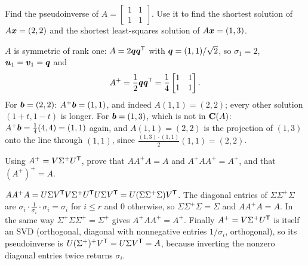 \begin{exercise}\label{exr:u36-ones}
Find the pseudoinverse of $A=\begin{bmatrix}1&1\\1&1\end{bmatrix}$. Use it to find the shortest solution of $A\boldsymbol{x}=(2,2)$ and the shortest least-squares solution of $A\boldsymbol{x}=(1,3)$.
\end{exercise}
\begin{solution}
$A$ is symmetric of rank one: $A=2\boldsymbol{q}\boldsymbol{q}^{\mathsf{T}}$ with $\boldsymbol{q}=(1,1)/\sqrt2$, so $\sigma_1=2$, $\boldsymbol{u}_1=\boldsymbol{v}_1=\boldsymbol{q}$ and
\[
A^{+}=\frac{1}{2}\boldsymbol{q}\boldsymbol{q}^{\mathsf{T}}=\frac14\begin{bmatrix}1&1\\1&1\end{bmatrix}.
\]
For $\boldsymbol{b}=(2,2)$: $A^{+}\boldsymbol{b}=(1,1)$, and indeed $A(1,1)=(2,2)$; every other solution $(1+t,1-t)$ is longer. For $\boldsymbol{b}=(1,3)$, which is not in $\mathbf{C}(A)$: $A^{+}\boldsymbol{b}=\tfrac14(4,4)=(1,1)$ again, and $A(1,1)=(2,2)$ is the projection of $(1,3)$ onto the line through $(1,1)$, since $\frac{(1,3)\cdot(1,1)}{2}(1,1)=(2,2)$.
\end{solution}

\begin{exercise}\label{exr:u36-penrose}
Using $A^{+}=V\Sigma^{+}U^{\mathsf{T}}$, prove that $AA^{+}A=A$ and $A^{+}AA^{+}=A^{+}$, and that $(A^{+})^{+}=A$.
\end{exercise}
\begin{solution}
$AA^{+}A=U\Sigma V^{\mathsf{T}} V\Sigma^{+}U^{\mathsf{T}} U\Sigma V^{\mathsf{T}}=U(\Sigma\Sigma^{+}\Sigma)V^{\mathsf{T}}$. The diagonal entries of $\Sigma\Sigma^{+}\Sigma$ are $\sigma_i\cdot\frac{1}{\sigma_i}\cdot\sigma_i=\sigma_i$ for $i\le r$ and $0$ otherwise, so $\Sigma\Sigma^{+}\Sigma=\Sigma$ and $AA^{+}A=A$. In the same way $\Sigma^{+}\Sigma\Sigma^{+}=\Sigma^{+}$ gives $A^{+}AA^{+}=A^{+}$. Finally $A^{+}=V\Sigma^{+}U^{\mathsf{T}}$ is itself an SVD (orthogonal, diagonal with nonnegative entries $1/\sigma_i$, orthogonal), so its pseudoinverse is $U(\Sigma^{+})^{+}V^{\mathsf{T}}=U\Sigma V^{\mathsf{T}}=A$, because inverting the nonzero diagonal entries twice returns $\sigma_i$.
\end{solution}
